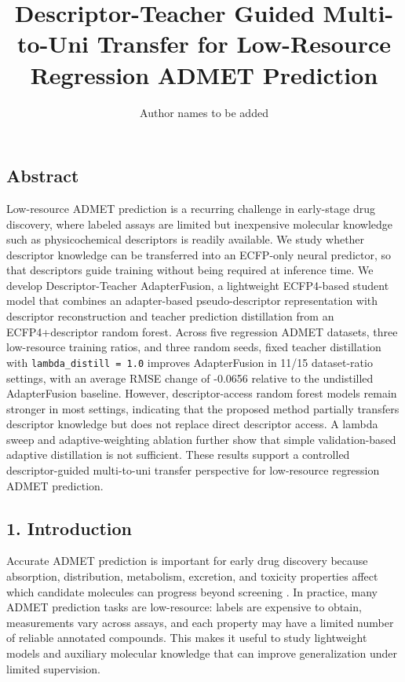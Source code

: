 \documentclass[
]{article}
\title{Descriptor-Teacher Guided Multi-to-Uni Transfer for Low-Resource
Regression ADMET Prediction}
\author{Author names to be added}
\date{}
\begin{document}
\maketitle

\subsection{Abstract}\label{abstract}

Low-resource ADMET prediction is a recurring challenge in early-stage
drug discovery, where labeled assays are limited but inexpensive
molecular knowledge such as physicochemical descriptors is readily
available. We study whether descriptor knowledge can be transferred into
an ECFP-only neural predictor, so that descriptors guide training
without being required at inference time. We develop Descriptor-Teacher
AdapterFusion, a lightweight ECFP4-based student model that combines an
adapter-based pseudo-descriptor representation with descriptor
reconstruction and teacher prediction distillation from an
ECFP4+descriptor random forest. Across five regression ADMET datasets,
three low-resource training ratios, and three random seeds, fixed
teacher distillation with \texttt{lambda\_distill\ =\ 1.0} improves
AdapterFusion in 11/15 dataset-ratio settings, with an average RMSE
change of -0.0656 relative to the undistilled AdapterFusion baseline.
However, descriptor-access random forest models remain stronger in most
settings, indicating that the proposed method partially transfers
descriptor knowledge but does not replace direct descriptor access. A
lambda sweep and adaptive-weighting ablation further show that simple
validation-based adaptive distillation is not sufficient. These results
support a controlled descriptor-guided multi-to-uni transfer perspective
for low-resource regression ADMET prediction.

\subsection{1. Introduction}\label{introduction}

Accurate ADMET prediction is important for early drug discovery because
absorption, distribution, metabolism, excretion, and toxicity properties
affect which candidate molecules can progress beyond screening
\citep{Vamathevan2019, Butler2018, Xiong2021ADMETlab}. In practice, many
ADMET prediction tasks are low-resource: labels are expensive to obtain,
measurements vary across assays, and each property may have a limited
number of reliable annotated compounds. This makes it useful to study
lightweight models and auxiliary molecular knowledge that can improve
generalization under limited supervision.
\end{document}
